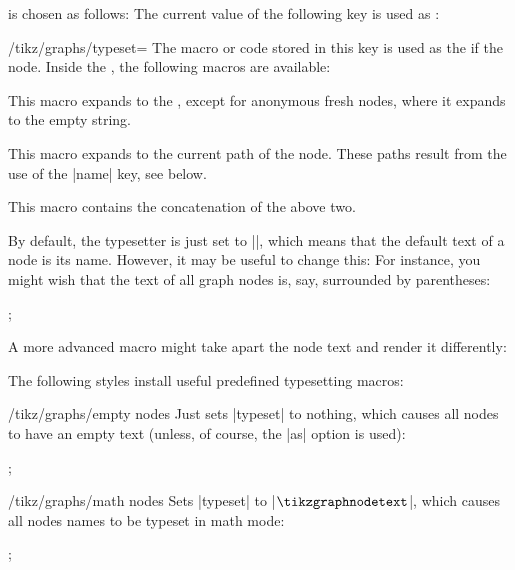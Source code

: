 \begin{itemize}
  is chosen as follows: The current value of the following key is used as
  :
  \begin{key}{/tikz/graphs/typeset=}
    The macro or code stored in this key is used as the
     if the node. Inside the , the following
    macros are available:
    \begin{command}{\tikzgraphnodetext}
      This macro expands to the , except for
      anonymous fresh nodes, where it expands to the empty string.
    \end{command}
    \begin{command}{\tikzgraphnodepath}
      This macro expands to the current path of the node. These
      paths result from the use of the |name| key, see below.
    \end{command}
    \begin{command}{\tikzgraphnodefullname}
      This macro contains the concatenation of the above two.
    \end{command}
  \end{key}
  By default, the typesetter is just set to |\tikzgraphnodetext|,
  which means that the default text of a node is its name. However,
  it may be useful to change this: For instance, you might wish that
  the text of all graph nodes is, say, surrounded by parentheses:
  \begin{codeexample}[]
\tikz {};
  \end{codeexample}
  A more advanced macro might take apart the node text and render it
  differently: 
  The following styles install useful predefined typesetting macros:
  \begin{key}{/tikz/graphs/empty nodes}
    Just sets |typeset| to nothing, which causes all nodes to have an
    empty text (unless, of course, the |as| option is used):
    \begin{codeexample}[]
\tikz {};  
    \end{codeexample}
  \end{key}
  \begin{key}{/tikz/graphs/math nodes}
    Sets |typeset| to |$\tikzgraphnodetext$|, which causes all nodes
    names to be typeset in math mode:
    \begin{codeexample}[]
\tikz {};  
    \end{codeexample}
  \end{key}
\end{itemize}

